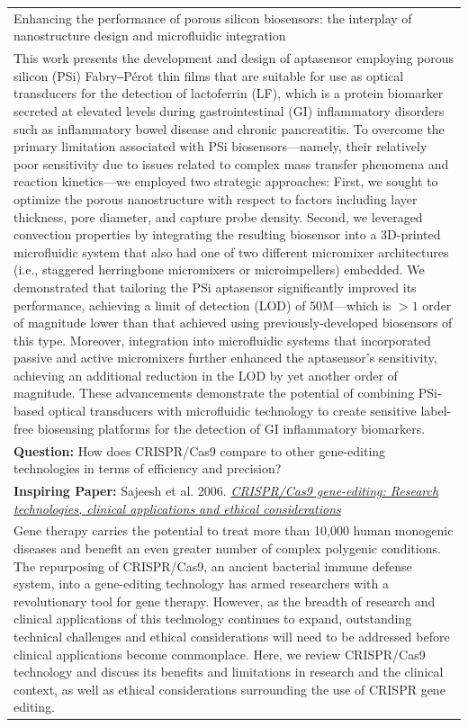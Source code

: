 \begin{table}[t!]
\begin{tabular}{p{14cm}}
{{Enhancing the performance of porous silicon biosensors: the interplay of nanostructure design and microfluidic integration} } \\
This work presents the development and design of aptasensor employing porous silicon (PSi) Fabry‒Pérot thin films that are suitable for use as optical transducers for the detection of lactoferrin (LF), which is a protein biomarker secreted at elevated levels during gastrointestinal (GI) inflammatory disorders such as inflammatory bowel disease and chronic pancreatitis. To overcome the primary limitation associated with PSi biosensors—namely, their relatively poor sensitivity due to issues related to complex mass transfer phenomena and reaction kinetics—we employed two strategic approaches: First, we sought to optimize the porous nanostructure with respect to factors including layer thickness, pore diameter, and capture probe density. Second, we leveraged convection properties by integrating the resulting biosensor into a 3D-printed microfluidic system that also had one of two different micromixer architectures (i.e., staggered herringbone micromixers or microimpellers) embedded. We demonstrated that tailoring the PSi aptasensor significantly improved its performance, achieving a limit of detection (LOD) of 50M—which is $>1$ order of magnitude lower than that achieved using previously-developed biosensors of this type. Moreover, integration into microfluidic systems that incorporated passive and active micromixers further enhanced the aptasensor’s sensitivity, achieving an additional reduction in the LOD by yet another order of magnitude. These advancements demonstrate the potential of combining PSi-based optical transducers with microfluidic technology to create sensitive label-free biosensing platforms for the detection of GI inflammatory biomarkers. \\\bottomrule
{\bf Question: } How does CRISPR/Cas9 compare to other gene-editing technologies in terms of efficiency and precision?\\\midrule
{\bf Inspiring Paper:} Sajeesh et al. 2006.  \href{https://www.semanticscholar.org/paper/CRISPR-Cas9-gene-editing\%3A-Research-technologies\%2C-Memi-Ntokou/36d936c75cbc7bd8b32a03c868256f9b260888ba}{\textit{CRISPR/Cas9 gene-editing: Research technologies, clinical applications and ethical considerations}} \\
Gene therapy carries the potential to treat more than 10,000 human monogenic diseases and benefit an even greater number of complex polygenic conditions. The repurposing of CRISPR/Cas9, an ancient bacterial immune defense system, into a gene-editing technology has armed researchers with a revolutionary tool for gene therapy. However, as the breadth of research and clinical applications of this technology continues to expand, outstanding technical challenges and ethical considerations will need to be addressed before clinical applications become commonplace. Here, we review CRISPR/Cas9 technology and discuss its benefits and limitations in research and the clinical context, as well as ethical considerations surrounding the use of CRISPR gene editing. \\

\end{tabular}
\end{table}

